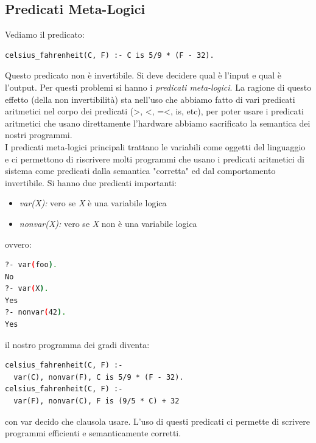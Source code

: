 \documentclass[a4paper,12pt, oneside]{book}
\begin{document}
\subsection{Predicati Meta-Logici}
Vediamo il predicato:
\begin{verbatim}
celsius_fahrenheit(C, F) :- C is 5/9 * (F - 32).
\end{verbatim}
Questo predicato non è invertibile. Si deve decidere qual è l'input e qual è l'output. Per questi problemi si hanno i \textit{predicati meta-logici}. La ragione di questo effetto (della non invertibilità) sta nell'uso che abbiamo fatto di vari predicati aritmetici nel corpo dei predicati (>, <, =<, is, etc), per poter usare i predicati aritmetici che usano direttamente l'hardware abbiamo sacrificato la semantica dei
nostri programmi.\\
I predicati meta-logici principali trattano le variabili come oggetti del linguaggio e ci permettono di riscrivere molti programmi che usano i predicati aritmetici di sistema come predicati dalla semantica "corretta" ed dal comportamento invertibile. Si hanno due predicati importanti:
\begin{itemize}
	\item \textit{var(X):}  vero se \textit{X} è una variabile logica
	\item \textit{nonvar(X):}  vero se \textit{X} non è una variabile logica
\end{itemize}
ovvero:

\begin{shaded}
	\begin{lstlisting}[language=bash]
?- var(foo).
No
?- var(X).
Yes
?- nonvar(42).
Yes
\end{lstlisting}
\end{shaded}

il nostro programma dei gradi diventa:
\begin{verbatim}
celsius_fahrenheit(C, F) :- 
  var(C), nonvar(F), C is 5/9 * (F - 32).
celsius_fahrenheit(C, F) :- 
  var(F), nonvar(C), F is (9/5 * C) + 32
\end{verbatim}
con var decido che clausola usare. L'uso di questi predicati ci permette di scrivere programmi efficienti e semanticamente corretti.
\end{document}
